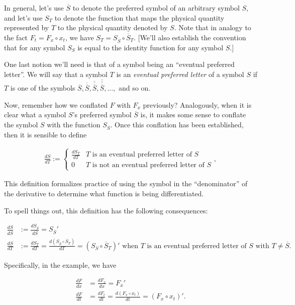 \documentclass{article}
\begin{document}
In general, let's use $\overline{S}$ to denote the preferred symbol of an arbitrary symbol $S$, and let's use $S_T$ to denote the function that maps the physical quantity represented by $T$ to the physical quantity denoted by $S$. Note that in analogy to the fact $F_t = F_x \circ x_t$, we have $S_T = S_{\overline{S}} \circ \overline{S}_T$. [We'll also establish the convention that for any symbol $S_S$ is equal to the identity function for any symbol $S$.] 

One last notion we'll need is that of a symbol being an ``eventual preferred letter''. We will say that a symbol $T$ is an \textit{eventual preferred letter} of a symbol $S$ if $T$ is one of the symbols $\overline{S}, \overline{\overline{S}}, \overline{\overline{\overline{S}}}, \overline{\overline{\overline{\overline{S}}}}, ...,$ and so on.

Now, remember how we conflated $F$ with $F_x$ previously? Analogously, when it is clear what a symbol $S$'s preferred symbol $\overline{S}$ is, it makes some sense to conflate the symbol $S$ with the function $S_{\overline{S}}$. Once this conflation has been established, then it is sensible to define 

\begin{align*}
    \frac{dS}{dT} :=
    \begin{cases}
        \frac{dS_T}{dT} & \text{$T$ is an eventual preferred letter of $S$} \\
        0 & \text{$T$ is not an eventual preferred letter of $S$}
    \end{cases},
\end{align*}

This definition formalizes practice of using the symbol in the ``denominator'' of the derivative to determine what function is being differentiated.

To spell things out, this definition has the following consequences:

\begin{align*}
    \frac{dS}{d\overline{S}} &:= \frac{dS_{\overline{S}}}{d\overline{S}} = {S_{\overline{S}}}' \\
    \frac{dS}{dT} &:= \frac{dS_T}{dT} = \frac{d(S_{\overline{S}} \circ \overline{S}_T)}{dT} = 
    (S_{\overline{S}} \circ \overline{S}_T)' \text{ when $T$ is an eventual preferred letter of $S$ with $T \neq \overline{S}$}.
\end{align*}

Specifically, in the example, we have

\begin{align*}
    \frac{dF}{dx} &= \frac{dF_x}{dx} = F_x' \\
    \frac{dF}{dt} &= \frac{dF_t}{dt} = \frac{d(F_x \circ x_t)}{dt} = (F_x \circ x_t)'.
\end{align*}
\end{document}
